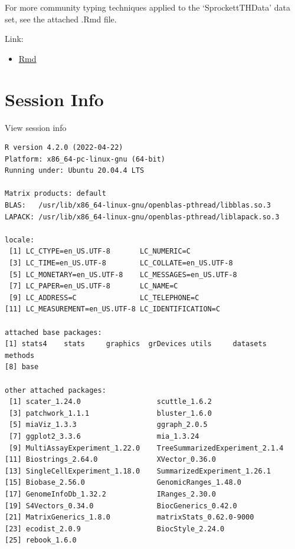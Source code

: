 \documentclass[
]{book}
\providecommand{\tightlist}{%
  \setlength{\itemsep}{0pt}\setlength{\parskip}{0pt}}
\begin{document}
For more community typing techniques applied to the `SprockettTHData' data set, see the attached .Rmd file.

Link:

\begin{itemize}
\tightlist
\item
  \href{add-comm-typing.Rmd}{Rmd}
\end{itemize}

\hypertarget{session-info-6}{%
\section*{Session Info}\label{session-info-6}}

View session info

\begin{verbatim}
R version 4.2.0 (2022-04-22)
Platform: x86_64-pc-linux-gnu (64-bit)
Running under: Ubuntu 20.04.4 LTS

Matrix products: default
BLAS:   /usr/lib/x86_64-linux-gnu/openblas-pthread/libblas.so.3
LAPACK: /usr/lib/x86_64-linux-gnu/openblas-pthread/liblapack.so.3

locale:
 [1] LC_CTYPE=en_US.UTF-8       LC_NUMERIC=C              
 [3] LC_TIME=en_US.UTF-8        LC_COLLATE=en_US.UTF-8    
 [5] LC_MONETARY=en_US.UTF-8    LC_MESSAGES=en_US.UTF-8   
 [7] LC_PAPER=en_US.UTF-8       LC_NAME=C                 
 [9] LC_ADDRESS=C               LC_TELEPHONE=C            
[11] LC_MEASUREMENT=en_US.UTF-8 LC_IDENTIFICATION=C       

attached base packages:
[1] stats4    stats     graphics  grDevices utils     datasets  methods  
[8] base     

other attached packages:
 [1] scater_1.24.0                  scuttle_1.6.2                 
 [3] patchwork_1.1.1                bluster_1.6.0                 
 [5] miaViz_1.3.3                   ggraph_2.0.5                  
 [7] ggplot2_3.3.6                  mia_1.3.24                    
 [9] MultiAssayExperiment_1.22.0    TreeSummarizedExperiment_2.1.4
[11] Biostrings_2.64.0              XVector_0.36.0                
[13] SingleCellExperiment_1.18.0    SummarizedExperiment_1.26.1   
[15] Biobase_2.56.0                 GenomicRanges_1.48.0          
[17] GenomeInfoDb_1.32.2            IRanges_2.30.0                
[19] S4Vectors_0.34.0               BiocGenerics_0.42.0           
[21] MatrixGenerics_1.8.0           matrixStats_0.62.0-9000       
[23] ecodist_2.0.9                  BiocStyle_2.24.0              
[25] rebook_1.6.0                  


\end{verbatim}
\end{document}
